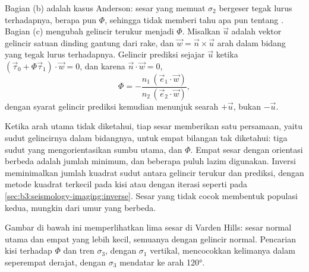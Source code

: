 Bagian (b) adalah kasus Anderson: sesar yang memuat $\sigma_2$ bergeser
tegak lurus terhadapnya, berapa pun $\Phi$, sehingga tidak memberi tahu apa pun tentang
. Bagian (c) mengubah gelincir terukur menjadi $\Phi$. Misalkan $\vec u$ adalah vektor
gelincir satuan dinding gantung dari rake, dan $\vec w = \vec n\times\vec
u$ arah dalam bidang yang tegak lurus terhadapnya. Gelincir prediksi
sejajar $\vec u$ ketika $(\vec\tau_0 + \Phi\vec\tau_1)\cdot\vec w = 0$, dan
karena $\vec n\cdot\vec w = 0$,
\[
  \Phi = -\frac{n_1\,(\vec e_1\cdot\vec w)}{n_2\,(\vec e_2\cdot\vec w)} ,
\]
dengan syarat gelincir prediksi kemudian menunjuk searah $+\vec u$, bukan $-\vec u$.

Ketika arah utama tidak diketahui, tiap sesar memberikan satu persamaan,
yaitu sudut gelincirnya dalam bidangnya, untuk empat bilangan tak diketahui: tiga sudut yang
mengorientasikan sumbu utama, dan $\Phi$. Empat sesar dengan orientasi berbeda adalah
jumlah minimum, dan beberapa puluh lazim digunakan. Inversi meminimalkan jumlah
kuadrat sudut antara gelincir terukur dan prediksi, dengan metode kuadrat terkecil
pada kisi atau dengan iterasi seperti pada \cref{sec:b3:seismology-imaging:inverse}.
Sesar yang tidak cocok membentuk populasi kedua, mungkin dari umur yang berbeda.

Gambar di bawah ini memperlihatkan lima sesar di Varden Hills: sesar normal utama
dan empat yang lebih kecil, semuanya dengan gelincir normal. Pencarian kisi terhadap $\Phi$ dan
tren $\sigma_3$, dengan $\sigma_1$ vertikal, mencocokkan kelimanya dalam
seperempat derajat, dengan $\sigma_3$ mendatar ke arah \ang{120}.

